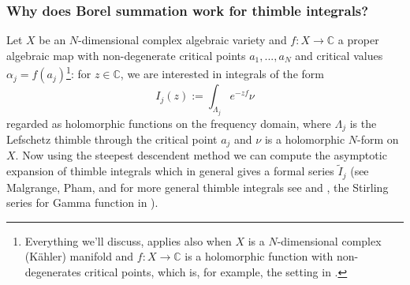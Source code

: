 \documentclass{article}
\theoremstyle{definition}
\newcommand{\C}{\mathbb{C}}
\begin{document}


\subsubsection{Why does Borel summation work for thimble integrals?}
Let $X$ be an $N$-dimensional complex algebraic variety and $f\colon X\to\C$ a proper algebraic map with non-degenerate critical points $a_1,...,a_N$ and critical values $\alpha_j=f(a_j)$\footnote{Everything we’ll discuss, applies also when $X$ is a $N$-dimensional complex (K\"ahler) manifold and $f\colon X\to\C$ is a holomorphic function with non-degenerates critical points, which is, for example, the setting in \cite{Witten}.}: for $z\in\C$, we are interested in integrals of the form 
\[
I_j(z):=\int_{\Lambda_j}e^{-zf}\nu
\]
regarded as holomorphic functions on the frequency domain, where $\Lambda_j$ is the Lefschetz thimble through the critical point $a_j$ and $\nu$ is a holomorphic $N$-form on $X$.
Now using the steepest descendent method we can compute the asymptotic expansion of thimble integrals which in general gives a formal series $\tilde{I}_j$ (see Malgrange, Pham, and for more general thimble integrals see \cite[Section 1.2.2]{mistegard_phdthesis} and \cite{andersen2020resurgence}, the Stirling series for Gamma function in \cite{Maxim_slide_ERC,Maxim_talk_2023}).
\end{document}

